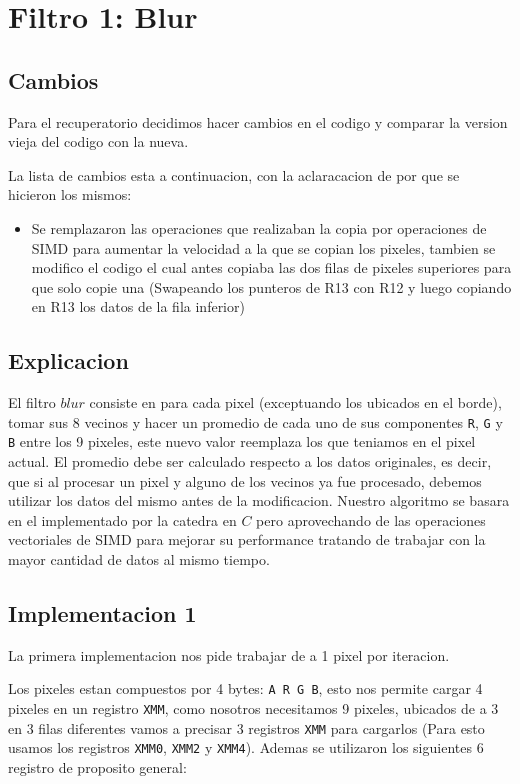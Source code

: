\section{Filtro 1: Blur}

\subsection{Cambios}
Para el recuperatorio decidimos hacer cambios en el codigo y comparar la version vieja del codigo con la nueva.

La lista de cambios esta a continuacion, con la aclaracacion de por que se hicieron los mismos:
\noindent
\begin{itemize}
\item Se remplazaron las operaciones que realizaban la copia por operaciones de SIMD para aumentar la velocidad a la que se copian los pixeles, tambien se modifico el codigo el cual antes copiaba las dos filas de pixeles superiores para que solo copie una (Swapeando los punteros de R13 con R12 y luego copiando en R13 los datos de la fila inferior)
\end{itemize}

\subsection{Explicacion}

El filtro $blur$ consiste en para cada pixel (exceptuando los ubicados en el borde), tomar sus 8 vecinos y hacer un promedio de cada uno de sus componentes \texttt{R}, \texttt{G} y \texttt{B} entre los 9 pixeles, este nuevo valor reemplaza los que teniamos en el pixel actual. El promedio debe ser calculado respecto a los datos originales, es decir, que si al procesar un pixel y alguno de los vecinos ya fue procesado, debemos utilizar los datos del mismo antes de la modificacion. Nuestro algoritmo se basara en el implementado por la catedra en $C$ pero aprovechando de las operaciones vectoriales de SIMD para mejorar su performance tratando de trabajar con la mayor cantidad de datos al mismo tiempo.

\subsection{Implementacion 1}
La primera implementacion nos pide trabajar de a 1 pixel por iteracion.

Los pixeles estan compuestos por 4 bytes: \texttt{A R G B}, esto nos permite cargar 4 pixeles en un registro \texttt{XMM}, como nosotros necesitamos 9 pixeles, ubicados de a 3 en 3 filas diferentes vamos a precisar 3 registros \texttt{XMM} para cargarlos (Para esto usamos los registros \texttt{XMM0}, \texttt{XMM2} y \texttt{XMM4}). Ademas se utilizaron los siguientes 6 registro de proposito general: \\

